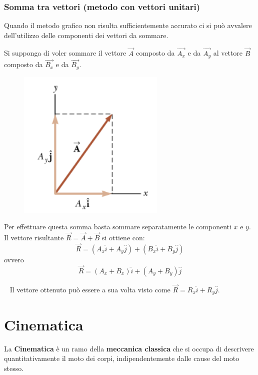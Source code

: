 \documentclass[12pt,oneside]{book}
\begin{document}
\subsection{Somma tra vettori (metodo con vettori unitari)}
Quando il metodo grafico non risulta sufficientemente accurato ci si può avvalere dell'utilizzo delle componenti dei vettori da sommare.

Si supponga di voler sommare il vettore $\vec{A}$ composto da $\vec{A_x}$ e da $\vec{A_y}$ al vettore $\vec{B}$
composto da $\vec{B_x}$ e da $\vec{B_y}$.

\begin{figure}[h]
    \includegraphics[scale=0.5]{vettori_unitari}
    \centering
\end{figure}

\noindent Per effettuare questa somma basta sommare separatamente le componenti $x$ e $y$. Il vettore risultante $\vec{R} = \vec{A} + \vec{B}$
si ottiene con:
\begin{equation*}
    \vec{R} = (A_x \hat{i} + A_y \hat{j}) + (B_x \hat{i} + B_y \hat{j})
\end{equation*}
ovvero
\begin{equation*}
    \vec{R} = (A_x+ B_x) \hat{i} + (A_y + B_y) \hat{j}
\end{equation*}

~\newline
\noindent Il vettore ottenuto può essere a sua volta visto come $\vec{R} = R_x \hat{i} + R_y \hat{j}$.



\chapter{Cinematica}

La \textbf{Cinematica} è un ramo della \textbf{meccanica classica} che si occupa di descrivere quantitativamente il moto dei corpi, indipendentemente dalle cause del moto stesso.
\end{document}

